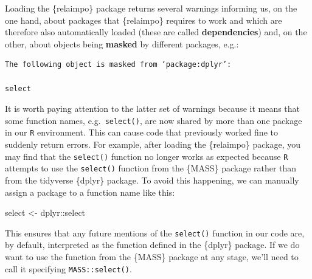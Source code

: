\documentclass[
  letterpaper,
  DIV=11,
  numbers=noendperiod]{scrreprt}
\newenvironment{Shaded}{\begin{snugshade}}{\end{snugshade}}
\newcommand{\NormalTok}[1]{\textcolor[rgb]{0.00,0.23,0.31}{#1}}
\newcommand{\OtherTok}[1]{\textcolor[rgb]{0.00,0.23,0.31}{#1}}
\newcommand{\SpecialCharTok}[1]{\textcolor[rgb]{0.37,0.37,0.37}{#1}}
\begin{document}
\begin{tcolorbox}[enhanced jigsaw, arc=.35mm, bottomrule=.15mm, bottomtitle=1mm, breakable, colback=white, colbacktitle=quarto-callout-important-color!10!white, colframe=quarto-callout-important-color-frame, coltitle=black, left=2mm, leftrule=.75mm, opacityback=0, opacitybacktitle=0.6, rightrule=.15mm, title=\textcolor{quarto-callout-important-color}{\faExclamation}\hspace{0.5em}{Important}, titlerule=0mm, toprule=.15mm, toptitle=1mm]

Loading the \{relaimpo\} package returns several warnings informing us,
on the one hand, about packages that \{relaimpo\} requires to work and
which are therefore also automatically loaded (these are called
\textbf{dependencies}) and, on the other, about objects being
\textbf{masked} by different packages, e.g.:

\begin{verbatim}
The following object is masked from ‘package:dplyr’:

select
\end{verbatim}

It is worth paying attention to the latter set of warnings because it
means that some function names, e.g.~\texttt{select()}, are now shared
by more than one package in our \texttt{R} environment. This can cause
code that previously worked fine to suddenly return errors. For example,
after loading the \{relaimpo\} package, you may find that the
\texttt{select()} function no longer works as expected because
\texttt{R} attempts to use the \texttt{select()} function from the
\{MASS\} package rather than from the tidyverse \{dplyr\} package. To
avoid this happening, we can manually assign a package to a function
name like this:

\begin{Shaded}
\begin{Highlighting}[]
\NormalTok{select }\OtherTok{\textless{}{-}}\NormalTok{ dplyr}\SpecialCharTok{::}\NormalTok{select}
\end{Highlighting}
\end{Shaded}

This ensures that any future mentions of the \texttt{select()} function
in our code are, by default, interpreted as the function defined in the
\{dplyr\} package. If we do want to use the function from the \{MASS\}
package at any stage, we'll need to call it specifying
\texttt{MASS::select()}.

\end{tcolorbox}
\end{document}
